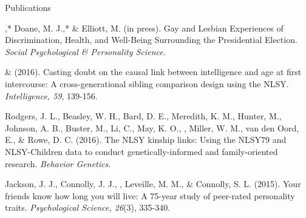 \begin{rSection}{\textrm{Publications}}%
\begin{etaremune}
\item\meb,* Doane, M. J.,* \& Elliott, M. (in press). Gay and Lesbian Experiences of Discrimination, Health, and Well-Being Surrounding the Presidential Election. \textit{Social Psychological \& Personality Science.}  \href{ https://dx.doi.org/10.17605/OSF.IO/DWSCM}{\color{blue}{Accepted Version}} %
\item\meb \& \Joe (2016). Casting doubt on the causal link between intelligence and age at first intercourse: A cross-generational sibling comparison design using the NLSY. \textit{Intelligence, 59}, 139-156. \href{http://www.sciencedirect.com/science/article/pii/S0160289616300162}{\color{blue}{doi:10.1016/j.intell.2016.08.008}}
\item Rodgers, J. L., Beasley, W. H., Bard, D. E., Meredith, K. M., Hunter, M., Johnson, A. B., Buster, M., Li, C., May, K. O., \meb, Miller, W. M., van den Oord, E., \& Rowe, D. C. (2016). The NLSY kinship links: Using the NLSY79 and NLSY-Children data to conduct genetically-informed and family-oriented research. \textit{Behavior Genetics}. \href{http://dx.doi.org/10.1007/s10519-016-9785-3}{\color{blue}{doi:10.1007/s10519-016-9785-3}}
%
\item Jackson, J. J., Connolly, J. J., \meb, Leveille, M. M., \& Connolly, S. L. (2015). Your friends know how long you will live: A 75-year study of peer-rated personality traits. \textit{Psychological Science, 26}(3), 335-340.\\ \href{http://pss.sagepub.com/content/26/3/335}{\color{blue}{doi:10.1177/0956797614561800}}
\end{etaremune}\end{rSection}%